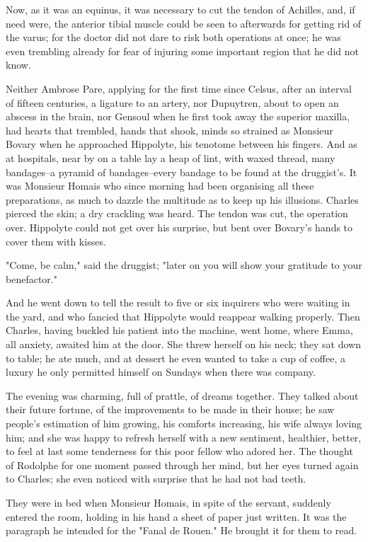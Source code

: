 \documentclass{tufte-book}
\begin{document}
Now, as it was an equinus, it was necessary to cut the tendon of
Achilles, and, if need were, the anterior tibial muscle could be seen to
afterwards for getting rid of the varus; for the doctor did not dare to
risk both operations at once; he was even trembling already for fear of
injuring some important region that he did not know.

Neither Ambrose Pare, applying for the first time since Celsus, after an
interval of fifteen centuries, a ligature to an artery, nor Dupuytren,
about to open an abscess in the brain, nor Gensoul when he first took
away the superior maxilla, had hearts that trembled, hands that shook,
minds so strained as Monsieur Bovary when he approached Hippolyte, his
tenotome between his fingers. And as at hospitals, near by on a table
lay a heap of lint, with waxed thread, many bandages--a pyramid of
bandages--every bandage to be found at the druggist's. It was Monsieur
Homais who since morning had been organising all these preparations,
as much to dazzle the multitude as to keep up his illusions. Charles
pierced the skin; a dry crackling was heard. The tendon was cut, the
operation over. Hippolyte could not get over his surprise, but bent over
Bovary's hands to cover them with kisses.

"Come, be calm," said the druggist; "later on you will show your
gratitude to your benefactor."

And he went down to tell the result to five or six inquirers who were
waiting in the yard, and who fancied that Hippolyte would reappear
walking properly. Then Charles, having buckled his patient into the
machine, went home, where Emma, all anxiety, awaited him at the door.
She threw herself on his neck; they sat down to table; he ate much,
and at dessert he even wanted to take a cup of coffee, a luxury he only
permitted himself on Sundays when there was company.

The evening was charming, full of prattle, of dreams together. They
talked about their future fortune, of the improvements to be made in
their house; he saw people's estimation of him growing, his comforts
increasing, his wife always loving him; and she was happy to refresh
herself with a new sentiment, healthier, better, to feel at last some
tenderness for this poor fellow who adored her. The thought of Rodolphe
for one moment passed through her mind, but her eyes turned again to
Charles; she even noticed with surprise that he had not bad teeth.

They were in bed when Monsieur Homais, in spite of the servant, suddenly
entered the room, holding in his hand a sheet of paper just written. It
was the paragraph he intended for the "Fanal de Rouen." He brought it
for them to read.
\end{document}
